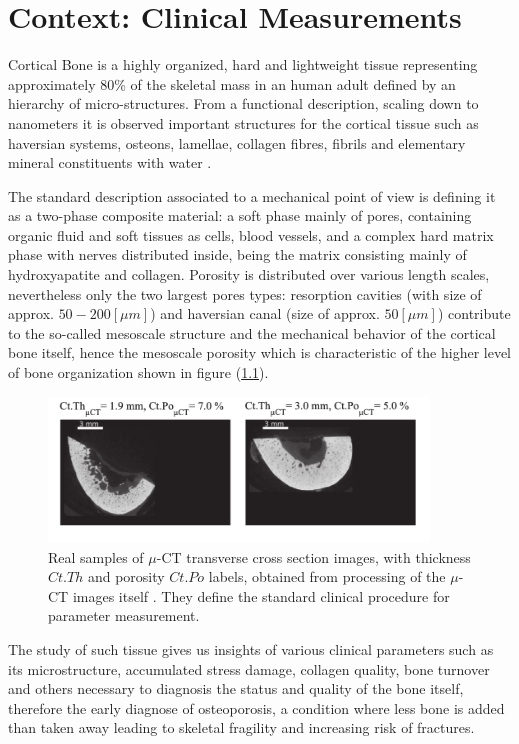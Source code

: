 \chapter{Context: Clinical Measurements}
Cortical Bone is a highly organized, hard and lightweight tissue representing approximately 80\% of the skeletal mass in an human adult defined by an hierarchy of micro-structures. From a functional description, scaling down to nanometers it is observed important structures for the cortical tissue such as haversian systems, osteons, lamellae, collagen fibres, fibrils and elementary mineral constituents with water \cite{Parnell2008}. 

The standard description associated to a mechanical point of view is defining it as a two-phase composite material: a soft phase mainly of pores, containing organic fluid and soft tissues as cells, blood vessels, and a complex hard matrix phase with nerves distributed inside, being the matrix consisting mainly of hydroxyapatite and collagen. Porosity is distributed over various length scales, nevertheless only the two largest pores types: resorption cavities (with size of approx. $50-200 [\mu m]$) and haversian canal (size of approx. $50 [ \mu m ]$) contribute to the so-called mesoscale structure and the mechanical behavior of the cortical bone itself, hence the mesoscale porosity which is characteristic of the higher level of bone organization shown in figure (\ref{muCT-Images}).

\begin{figure}[!h]
	\centering
	\includegraphics[width=0.9\textwidth]{images/ImgExt/CT-ImagesTwoCases.png}
	\caption{Real samples of $\mu$-CT transverse cross section images, with thickness $Ct.Th$ and porosity $Ct.Po$ labels, obtained from processing of the $\mu$-CT images itself \cite{Minonzio2018}. They define the standard clinical procedure for parameter measurement.}
	\label{muCT-Images}
\end{figure}

The study of such tissue gives us insights of various clinical parameters such as its microstructure, accumulated stress damage, collagen quality, bone turnover and others necessary to diagnosis the status and quality of the bone itself, therefore the early diagnose of osteoporosis, a condition where less bone is added than taken away leading to skeletal fragility and increasing risk of fractures.

